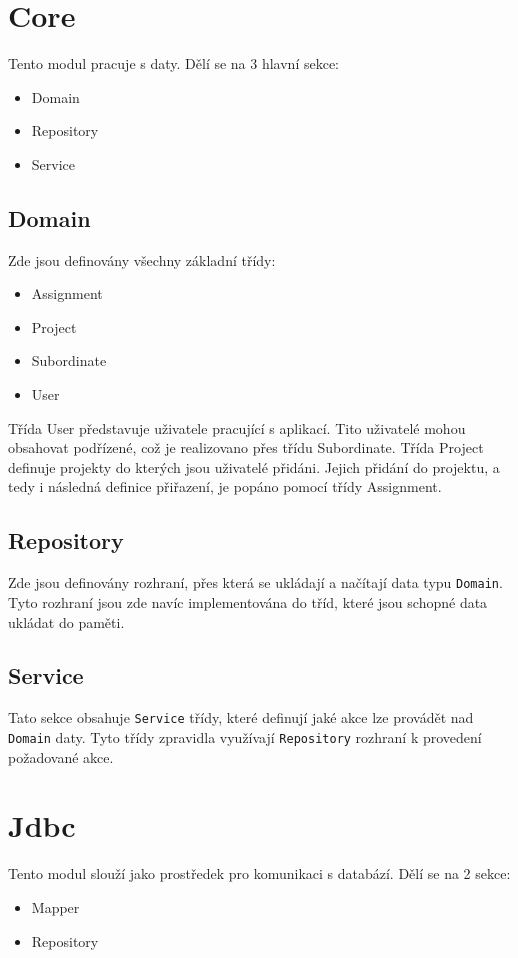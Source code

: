\documentclass[czech,P5]{thesiskiv}
\begin{document}
\section{Core}
Tento modul pracuje s daty. Dělí se na 3 hlavní sekce:
\begin{itemize}
             \item Domain
             \item Repository
             \item Service
\end{itemize}
\subsection{Domain}
Zde jsou definovány všechny základní třídy:
\begin{itemize}
             \item Assignment
             \item Project
             \item Subordinate
             \item User
\end{itemize}
Třída User představuje uživatele pracující s aplikací. Tito uživatelé mohou obsahovat podřízené, což je realizovano přes třídu Subordinate. Třída Project definuje projekty do kterých jsou uživatelé přidáni. Jejich přidání do projektu, a tedy i následná definice přiřazení, je popáno pomocí třídy Assignment.
\subsection{Repository}
Zde jsou definovány rozhraní, přes která se ukládají a načítají data typu \texttt{Domain}. Tyto rozhraní jsou zde navíc implementována do tříd, které jsou schopné data ukládat do paměti.
\subsection{Service}
Tato sekce obsahuje \texttt{Service} třídy, které definují jaké akce lze provádět nad \texttt{Domain} daty. Tyto třídy zpravidla využívají \texttt{Repository} rozhraní k provedení požadované akce.
\section{Jdbc}
Tento modul slouží jako prostředek pro komunikaci s databází. Dělí se na 2 sekce:
\begin{itemize}
             \item Mapper
             \item Repository
\end{itemize}
\end{document}
